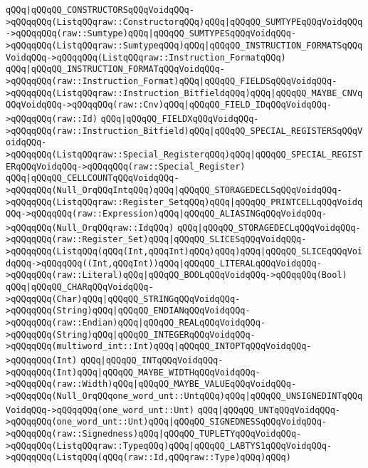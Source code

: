 \verb|qQQq|\verb#|qQQqQQ_CONSTRUCTORSqQQqVoidqQQq->qQQqqQQq(ListqQQqraw::ConstructorqQQq)qQQq|qQQqQQ_SUMTYPEqQQqVoidqQQq->qQQqqQQq(raw::Sumtype)qQQq|qQQqQQ_SUMTYPESqQQqVoidqQQq->qQQqqQQq(ListqQQqraw::SumtypeqQQq)qQQq|qQQqQQ_INSTRUCTION_FORMATSqQQqVoidqQQq->qQQqqQQq(ListqQQqraw::Instruction_FormatqQQq)#\newline
\verb|qQQq|\verb#|qQQqQQ_INSTRUCTION_FORMATqQQqVoidqQQq->qQQqqQQq(raw::Instruction_Format)qQQq|qQQqQQ_FIELDSqQQqVoidqQQq->qQQqqQQq(ListqQQqraw::Instruction_BitfieldqQQq)qQQq|qQQqQQ_MAYBE_CNVqQQqVoidqQQq->qQQqqQQq(raw::Cnv)qQQq|qQQqQQ_FIELD_IDqQQqVoidqQQq->qQQqqQQq(raw::Id)#\newline
\verb|qQQq|\verb#|qQQqQQ_FIELDXqQQqVoidqQQq->qQQqqQQq(raw::Instruction_Bitfield)qQQq|qQQqQQ_SPECIAL_REGISTERSqQQqVoidqQQq->qQQqqQQq(ListqQQqraw::Special_RegisterqQQq)qQQq|qQQqQQ_SPECIAL_REGISTERqQQqVoidqQQq->qQQqqQQq(raw::Special_Register)#\newline
\verb|qQQq|\verb#|qQQqQQ_CELLCOUNTqQQqVoidqQQq->qQQqqQQq(Null_OrqQQqIntqQQq)qQQq|qQQqQQ_STORAGEDECLSqQQqVoidqQQq->qQQqqQQq(ListqQQqraw::Register_SetqQQq)qQQq|qQQqQQ_PRINTCELLqQQqVoidqQQq->qQQqqQQq(raw::Expression)qQQq|qQQqQQ_ALIASINGqQQqVoidqQQq->qQQqqQQq(Null_OrqQQqraw::IdqQQq)#\newline
\verb|qQQq|\verb#|qQQqQQ_STORAGEDECLqQQqVoidqQQq->qQQqqQQq(raw::Register_Set)qQQq|qQQqQQ_SLICESqQQqVoidqQQq->qQQqqQQq(ListqQQq(qQQq(Int,qQQqInt)qQQq)qQQq)qQQq|qQQqQQ_SLICEqQQqVoidqQQq->qQQqqQQq((Int,qQQqInt))qQQq|qQQqQQ_LITERALqQQqVoidqQQq->qQQqqQQq(raw::Literal)qQQq|qQQqQQ_BOOLqQQqVoidqQQq->qQQqqQQq(Bool)#\newline
\verb|qQQq|\verb#|qQQqQQ_CHARqQQqVoidqQQq->qQQqqQQq(Char)qQQq|qQQqQQ_STRINGqQQqVoidqQQq->qQQqqQQq(String)qQQq|qQQqQQ_ENDIANqQQqVoidqQQq->qQQqqQQq(raw::Endian)qQQq|qQQqQQ_REALqQQqVoidqQQq->qQQqqQQq(String)qQQq|qQQqQQ_INTEGERqQQqVoidqQQq->qQQqqQQq(multiword_int::Int)qQQq|qQQqQQ_INTOPTqQQqVoidqQQq->qQQqqQQq(Int)#\newline
\verb|qQQq|\verb#|qQQqQQ_INTqQQqVoidqQQq->qQQqqQQq(Int)qQQq|qQQqQQ_MAYBE_WIDTHqQQqVoidqQQq->qQQqqQQq(raw::Width)qQQq|qQQqQQ_MAYBE_VALUEqQQqVoidqQQq->qQQqqQQq(Null_OrqQQqone_word_unt::UntqQQq)qQQq|qQQqQQ_UNSIGNEDINTqQQqVoidqQQq->qQQqqQQq(one_word_unt::Unt)#\newline
\verb|qQQq|\verb#|qQQqQQ_UNTqQQqVoidqQQq->qQQqqQQq(one_word_unt::Unt)qQQq|qQQqQQ_SIGNEDNESSqQQqVoidqQQq->qQQqqQQq(raw::Signedness)qQQq|qQQqQQ_TUPLETYqQQqVoidqQQq->qQQqqQQq(ListqQQqraw::TypeqQQq)qQQq|qQQqQQ_LABTYS1qQQqVoidqQQq->qQQqqQQq(ListqQQq(qQQq(raw::Id,qQQqraw::Type)qQQq)qQQq)#\newline

